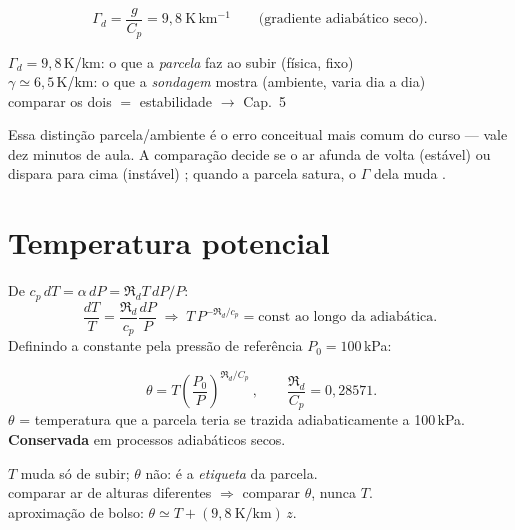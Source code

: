 \documentclass[11pt]{article}
\begin{document}
\begin{formalivro}[Stull eq.~3.14]
\[ \Gamma_d = \frac{g}{C_p} = 9{,}8\ \mathrm{K\,km^{-1}}
\qquad \text{(gradiente adiabático seco)}. \]
\end{formalivro}

\begin{noquadro}
$\Gamma_d = 9{,}8$\,K/km: o que a \emph{parcela} faz ao subir
(física, fixo)\\
$\gamma \simeq 6{,}5$\,K/km: o que a \emph{sondagem} mostra
(ambiente, varia dia a dia)\\[2pt]
comparar os dois $=$ estabilidade $\to$ Cap.~5
\end{noquadro}

Essa distinção parcela/ambiente é o erro conceitual mais comum do curso —
vale dez minutos de aula. A comparação decide se o ar afunda de volta
(estável) ou dispara para cima (instável) ; quando a parcela satura, o $\Gamma$ dela muda
 .

\section{Temperatura potencial}\label{sec:theta}


\begin{formadif}[dedução]
De $c_p\,dT = \alpha\,dP = \Re_d T\,dP/P$:
\[ \frac{dT}{T} = \frac{\Re_d}{c_p}\frac{dP}{P}
\;\Longrightarrow\;
T\,P^{-\Re_d/c_p} = \text{const ao longo da adiabática}. \]
Definindo a constante pela pressão de referência $P_0 = 100$\,kPa:
\end{formadif}

\begin{formalivro}[Stull eq.~3.12]
\[ \boxed{\ \theta = T\left(\frac{P_0}{P}\right)^{\Re_d/C_p}\ },
\qquad \frac{\Re_d}{C_p} = 0{,}28571. \]
$\theta$ = temperatura que a parcela teria se trazida adiabaticamente a
100\,kPa. \textbf{Conservada} em processos adiabáticos secos.
\end{formalivro}

\begin{noquadro}
$T$ muda só de subir; $\theta$ não: é a \emph{etiqueta} da parcela.\\
comparar ar de alturas diferentes $\Rightarrow$ comparar $\theta$, nunca
$T$.\\
aproximação de bolso: $\theta \simeq T + (9{,}8\ \mathrm{K/km})\,z$.
\end{noquadro}
\end{document}
